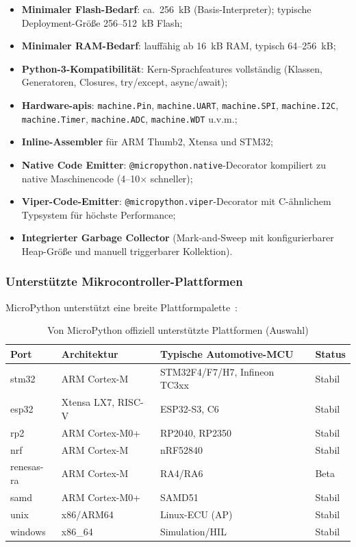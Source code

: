 ﻿\documentclass[12pt,a4paper,twoside]{article}
\begin{document}
\begin{itemize}
  \item \textbf{Minimaler Flash-Bedarf}: ca.\ 256~kB (Basis-Interpreter);
        typische Deployment-Größe 256--512~kB Flash;
  \item \textbf{Minimaler RAM-Bedarf}: lauffähig ab 16~kB RAM,
        typisch 64--256~kB;
  \item \textbf{Python-3-Kompatibilität}: Kern-Sprachfeatures vollständig
        (Klassen, Generatoren, Closures, try/except, async/await);
  \item \textbf{Hardware-\glspl{api}}: \texttt{machine.Pin}, \texttt{machine.UART},
        \texttt{machine.SPI}, \texttt{machine.I2C}, \newline \texttt{machine.Timer},
        \texttt{machine.ADC}, \texttt{machine.WDT} u.v.m.;
  \item \textbf{Inline-Assembler} für ARM Thumb2, Xtensa und STM32;
  \item \textbf{Native Code Emitter}: \texttt{@micropython.native}-Decorator
        kompiliert zu native Maschinencode (4--10$\times$ schneller);
  \item \textbf{Viper-Code-Emitter}: \texttt{@micropython.viper}-Decorator
        mit C-ähnlichem Typsystem für höchste Performance;
  \item \textbf{Integrierter Garbage Collector} (Mark-and-Sweep mit
        konfigurierbarer Heap-Größe und manuell triggerbarer Kollektion).
\end{itemize}

\subsubsection{Unterstützte Mikrocontroller-Plattformen}
MicroPython unterstützt eine breite Plattformpalette~\cite{micropython_ports2023}:

\begin{table}[h]
\centering
\caption{Von MicroPython offiziell unterstützte Plattformen (Auswahl)}
\label{tab:micropython_platforms}
\begin{tabular}{llll}
\toprule
\textbf{Port} & \textbf{Architektur} & \textbf{Typische Automotive-MCU} & \textbf{Status} \\
\midrule
stm32  & ARM Cortex-M & STM32F4/F7/H7, Infineon TC3xx & Stabil \\
esp32  & Xtensa LX7, RISC-V & ESP32-S3, C6 & Stabil \\
rp2    & ARM Cortex-M0+ & RP2040, RP2350 & Stabil \\
nrf    & ARM Cortex-M & nRF52840 & Stabil \\
renesas-ra & ARM Cortex-M & RA4/RA6 & Beta \\
samd   & ARM Cortex-M0+ & SAMD51 & Stabil \\
unix   & x86/ARM64 & Linux-ECU (AP) & Stabil \\
windows & x86\_64 & Simulation/HIL & Stabil \\
\bottomrule
\end{tabular}
\end{table}
\end{document}
